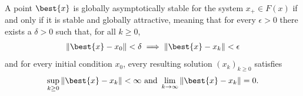 \begin{definition}
\label{def: global asymptotic stability}
    A point $\best{x}$ is globally asymptotically stable for the system $x_+ \in F(x)$ if and only if it is stable and globally attractive,
    meaning that for every $\epsilon > 0$ there exists a $\delta>0$ such that, for all $k \geq 0$,
    \begin{align*}
        \| \best{x} - x_0 \| < \delta
        \implies
        \| \best{x} - x_k \| < \epsilon
    \end{align*}
    and for every initial condition $x_0$, every resulting solution $(x_k)_{k \geq 0}$ satisfies
    \begin{align*}
        \sup_{k \geq 0}\| \best{x} - x_k \| < \infty
        \ \text{and} \
        \lim_{k \to \infty} \| \best{x} - x_k \| = 0 .
    \end{align*}
\end{definition}